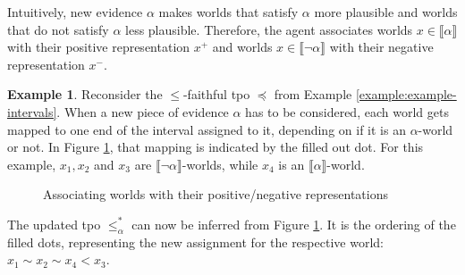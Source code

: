 \documentclass[english, 12pt]{scrartcl}
\theoremstyle{definition}
\newtheorem{example}{Example}
\theoremstyle{definition}
\theoremstyle{definition}
\newcommand{\modelsOf}[1]{\llbracket #1 \rrbracket}
\begin{document}
Intuitively, new evidence $\alpha$ makes worlds that satisfy $\alpha$ more plausible and worlds that do not satisfy $\alpha$ less plausible. Therefore, the agent associates worlds $x \in \modelsOf{\alpha}$ with their positive representation $x^{+}$ and worlds $x \in \modelsOf{\neg\alpha}$ with their negative representation $x^{-}$.

\begin{example}
    \label{example:example-updated-tpo}
    Reconsider the $\leq$-faithful tpo $\preceq$ from Example \ref{example:example-intervals}. When a new piece of evidence $\alpha$ has to be considered, each world gets mapped to one end of the interval assigned to it, depending on if it is an $\alpha$-world or not. In Figure \ref{fig:example-updated-tpo}, that mapping is indicated by the filled out dot. For this example, $x_{1}, x_{2}$ and $x_{3}$ are $\modelsOf{\neg\alpha}$-worlds, while $x_{4}$ is an $\modelsOf{\alpha}$-world.

    \begin{figure}[H]
        \centering
        \caption{Associating worlds with their positive/negative representations}
        \label{fig:example-updated-tpo}
    \end{figure}
    
    The updated tpo $\leq_{\alpha}^{\ast}$ can now be inferred from Figure \ref{fig:example-updated-tpo}. It is the ordering of the filled dots, representing the new assignment for the respective world: $x_{1} \sim x_{2} \sim x_{4} < x_{3}$.
\end{example}
\end{document}
